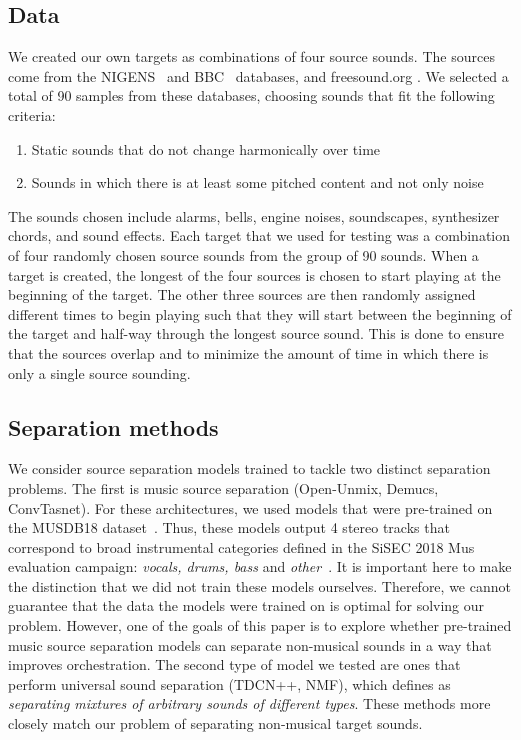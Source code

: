 \documentclass{article}
\begin{document}
    \subsection{Data}\label{subsec:data}
    We created our own targets as combinations of four source sounds. The sources come from the NIGENS~\cite{NIGENS} and BBC~\cite{BBC} databases, and freesound.org \cite{freesound}. We selected a total of 90 samples from these databases, choosing sounds that fit the following criteria: 
    
    \begin{enumerate}
    	\item Static sounds that do not change harmonically over time
    	\item Sounds in which there is at least some pitched content and not only noise
    \end{enumerate}     
    The sounds chosen include alarms, bells, engine noises, soundscapes, synthesizer chords, and sound effects. Each target that we used for testing was a combination of four randomly chosen source sounds from the group of 90 sounds. 
    When a target is created, the longest of the four sources is chosen to start playing at the beginning of the target. The other three sources are then randomly assigned different times to begin playing such that they will start between the beginning of the target and half-way through the longest source sound. This is done to ensure that the sources overlap and to minimize the amount of time in which there is only a single source sounding. 
    
    \subsection{Separation methods}
  We consider source separation models trained to tackle two distinct separation problems. The first is music source separation (Open-Unmix, Demucs, ConvTasnet). For these architectures, we used models that were pre-trained on the MUSDB18 dataset~\cite{MUSDB18}. Thus, these models output 4 stereo tracks that correspond to broad instrumental categories defined in the SiSEC 2018 Mus evaluation campaign: \textit{vocals, drums, bass} and \textit{other}~\cite{Stoter_SiSEC}. It is important here to make the distinction that we did not train these models ourselves. Therefore, we cannot guarantee that the data the models were trained on is optimal for solving our problem. However, one of the goals of this paper is to explore whether pre-trained music source separation models can separate non-musical sounds in a way that improves orchestration.
  The second type of model we tested are ones that perform universal sound separation (TDCN++, NMF), which \cite{tdcnpp} defines as \textit{separating mixtures of arbitrary sounds of different types}. These methods more closely match our problem of separating non-musical target sounds.
      
\end{document}
